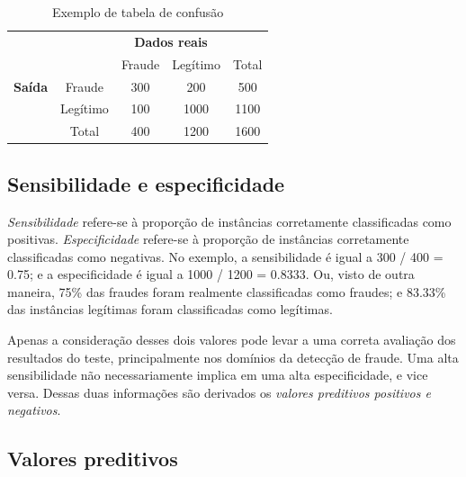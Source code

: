 \renewcommand{\arraystretch}{1.5}
\vspace{2mm}
\begin{table}[h!]
    \centering
    \begin{tabular}{c l c c c}
        & & \multicolumn{2}{c}{\textbf{Dados reais}} \\
        \multirow{3}{5mm}{\begin{sideways}\parbox{20mm}{\textbf{Saída}}\end{sideways}} & \multicolumn{1}{c|}{} & Fraude & Legítimo & \multicolumn{1}{|c}{Total} \\
        \cline{2-5}
        & \multicolumn{1}{c|}{Fraude}   & 300 & 200   & \multicolumn{1}{|c}{500}  \\
        & \multicolumn{1}{c|}{Legítimo} & 100 & 1000  & \multicolumn{1}{|c}{1100} \\
        \cline{2-5}
        & \multicolumn{1}{c|}{Total}    & 400 & 1200  & \multicolumn{1}{|c}{1600} \\
    \end{tabular}
    \caption{Exemplo de tabela de confusão}
    \label{fraud:ex}
\end{table}
\vspace{2mm}

\subsection{Sensibilidade e especificidade}

\emph{Sensibilidade} refere-se à proporção de instâncias corretamente classificadas como positivas. \emph{Especificidade} refere-se à proporção de instâncias corretamente classificadas como negativas. No exemplo, a sensibilidade é igual a 300 / 400 = 0.75; e a especificidade é igual a 1000 / 1200 = 0.8333. Ou, visto de outra maneira, 75\% das fraudes foram realmente classificadas como fraudes; e 83.33\% das instâncias legítimas foram classificadas como legítimas.

Apenas a consideração desses dois valores pode levar a uma correta avaliação dos resultados do teste, principalmente nos domínios da detecção de fraude. Uma alta sensibilidade não necessariamente implica em uma alta especificidade, e vice versa. Dessas duas informações são derivados os \emph{valores preditivos positivos e negativos}.

\subsection{Valores preditivos}

